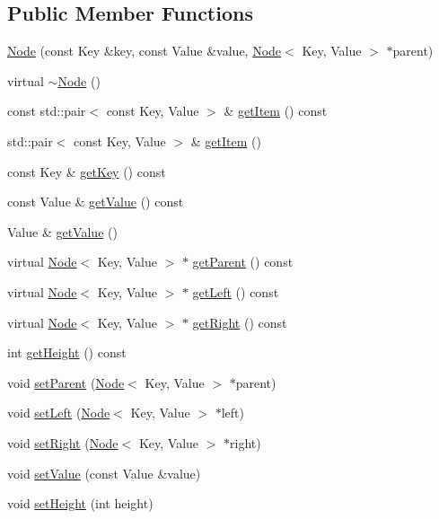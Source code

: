 \subsection*{Public Member Functions}
\begin{DoxyCompactItemize}
\item 
\mbox{\hyperlink{classNode_ac9bdc0036be15ac4b622696c804c501f}{Node}} (const Key \&key, const Value \&value, \mbox{\hyperlink{classNode}{Node}}$<$ Key, Value $>$ $\ast$parent)
\item 
virtual \mbox{\hyperlink{classNode_aaa753148a7bac7330974f1a9bc9249f1}{$\sim$\+Node}} ()
\item 
const std\+::pair$<$ const Key, Value $>$ \& \mbox{\hyperlink{classNode_a41e3bd64767b0a5ed30c6f9d8d6b3ead}{get\+Item}} () const
\item 
std\+::pair$<$ const Key, Value $>$ \& \mbox{\hyperlink{classNode_a4e683e6ac10c3015939f9598bb2c2629}{get\+Item}} ()
\item 
const Key \& \mbox{\hyperlink{classNode_a9ad1feabf07e276143802749d48a5736}{get\+Key}} () const
\item 
const Value \& \mbox{\hyperlink{classNode_a8c36066d5be674c07d2b3805cc76fc08}{get\+Value}} () const
\item 
Value \& \mbox{\hyperlink{classNode_abdbbc3b9627d1bfe2106c2000d410811}{get\+Value}} ()
\item 
virtual \mbox{\hyperlink{classNode}{Node}}$<$ Key, Value $>$ $\ast$ \mbox{\hyperlink{classNode_a69339fc2a76f5b4456ecc930703f93cd}{get\+Parent}} () const
\item 
virtual \mbox{\hyperlink{classNode}{Node}}$<$ Key, Value $>$ $\ast$ \mbox{\hyperlink{classNode_aaa2c1b8458c0df8489ac991cf03d3c33}{get\+Left}} () const
\item 
virtual \mbox{\hyperlink{classNode}{Node}}$<$ Key, Value $>$ $\ast$ \mbox{\hyperlink{classNode_a148e0ef6995e7c8aa344779e0cca507a}{get\+Right}} () const
\item 
int \mbox{\hyperlink{classNode_a42201a49f8c8bef979f79baa75d70109}{get\+Height}} () const
\item 
void \mbox{\hyperlink{classNode_a981799e30e7649812c2ad3a2d43c3f94}{set\+Parent}} (\mbox{\hyperlink{classNode}{Node}}$<$ Key, Value $>$ $\ast$parent)
\item 
void \mbox{\hyperlink{classNode_af0a4ecd342adca0c1db88f0811ad0068}{set\+Left}} (\mbox{\hyperlink{classNode}{Node}}$<$ Key, Value $>$ $\ast$left)
\item 
void \mbox{\hyperlink{classNode_ade5c16875afa559250c7a49d56007685}{set\+Right}} (\mbox{\hyperlink{classNode}{Node}}$<$ Key, Value $>$ $\ast$right)
\item 
void \mbox{\hyperlink{classNode_ab9b9a0da6a6b481623a3d1a7de5594a9}{set\+Value}} (const Value \&value)
\item 
void \mbox{\hyperlink{classNode_ada6fa2c6e9c7ab2330e63ab44199ed35}{set\+Height}} (int height)
\end{DoxyCompactItemize}
